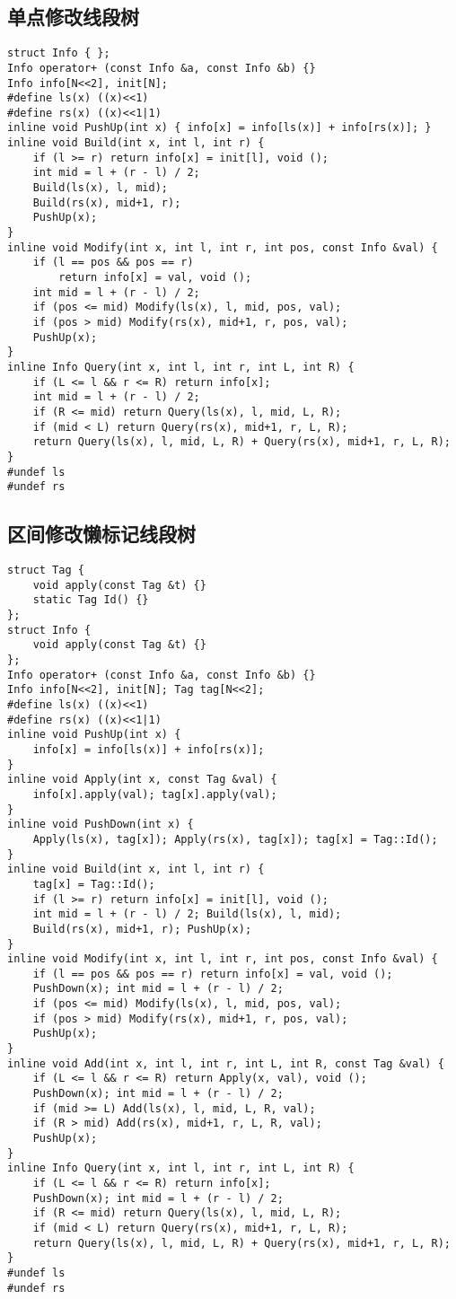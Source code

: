 \documentclass[a4paper,landscape,twocolumn]{ctexart}
\begin{document}
\subsection{单点修改线段树}

\begin{lstlisting}
struct Info { };
Info operator+ (const Info &a, const Info &b) {}
Info info[N<<2], init[N];
#define ls(x) ((x)<<1)
#define rs(x) ((x)<<1|1)
inline void PushUp(int x) { info[x] = info[ls(x)] + info[rs(x)]; }
inline void Build(int x, int l, int r) {
	if (l >= r) return info[x] = init[l], void ();
	int mid = l + (r - l) / 2;
	Build(ls(x), l, mid);
	Build(rs(x), mid+1, r);
	PushUp(x);
}
inline void Modify(int x, int l, int r, int pos, const Info &val) {
	if (l == pos && pos == r)
		return info[x] = val, void ();
	int mid = l + (r - l) / 2;
	if (pos <= mid) Modify(ls(x), l, mid, pos, val);
	if (pos > mid) Modify(rs(x), mid+1, r, pos, val);
	PushUp(x);
}
inline Info Query(int x, int l, int r, int L, int R) {
	if (L <= l && r <= R) return info[x];
	int mid = l + (r - l) / 2;
	if (R <= mid) return Query(ls(x), l, mid, L, R);
	if (mid < L) return Query(rs(x), mid+1, r, L, R);
	return Query(ls(x), l, mid, L, R) + Query(rs(x), mid+1, r, L, R);
}
#undef ls
#undef rs
\end{lstlisting}

\subsection{区间修改懒标记线段树}

\begin{lstlisting}
struct Tag {
	void apply(const Tag &t) {}
	static Tag Id() {}
};
struct Info {
	void apply(const Tag &t) {}
};
Info operator+ (const Info &a, const Info &b) {}
Info info[N<<2], init[N]; Tag tag[N<<2];
#define ls(x) ((x)<<1)
#define rs(x) ((x)<<1|1)
inline void PushUp(int x) {
	info[x] = info[ls(x)] + info[rs(x)];
}
inline void Apply(int x, const Tag &val) {
	info[x].apply(val); tag[x].apply(val);
}
inline void PushDown(int x) {
	Apply(ls(x), tag[x]); Apply(rs(x), tag[x]); tag[x] = Tag::Id();
}
inline void Build(int x, int l, int r) {
	tag[x] = Tag::Id();
	if (l >= r) return info[x] = init[l], void ();
	int mid = l + (r - l) / 2; Build(ls(x), l, mid);
	Build(rs(x), mid+1, r); PushUp(x);
}
inline void Modify(int x, int l, int r, int pos, const Info &val) {
	if (l == pos && pos == r) return info[x] = val, void ();
	PushDown(x); int mid = l + (r - l) / 2;
	if (pos <= mid) Modify(ls(x), l, mid, pos, val);
	if (pos > mid) Modify(rs(x), mid+1, r, pos, val);
	PushUp(x);
}
inline void Add(int x, int l, int r, int L, int R, const Tag &val) {
	if (L <= l && r <= R) return Apply(x, val), void ();
	PushDown(x); int mid = l + (r - l) / 2;
	if (mid >= L) Add(ls(x), l, mid, L, R, val);
	if (R > mid) Add(rs(x), mid+1, r, L, R, val);
	PushUp(x);
}
inline Info Query(int x, int l, int r, int L, int R) {
	if (L <= l && r <= R) return info[x];
	PushDown(x); int mid = l + (r - l) / 2;
	if (R <= mid) return Query(ls(x), l, mid, L, R);
	if (mid < L) return Query(rs(x), mid+1, r, L, R);
	return Query(ls(x), l, mid, L, R) + Query(rs(x), mid+1, r, L, R);
}
#undef ls
#undef rs
\end{lstlisting}
\end{document}
